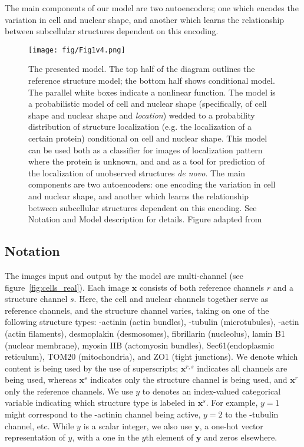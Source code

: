 \documentclass[accepted]{article}
\begin{document}
The main components of our model are two autoencoders; one which encodes the variation in cell and nuclear shape, and another which learns the relationship between subcellular structures dependent on this encoding.

\begin{figure}[htbp]
\centering
\texttt{[image: fig/Fig1v4.png]}
\caption{The presented model.
The top half of the diagram outlines the reference structure model; the bottom half shows conditional model.
The parallel white boxes indicate a nonlinear function.
The model is a probabilistic model of cell and nuclear shape (specifically, of cell shape and nuclear shape and \emph{location}) wedded to a probability distribution of structure localization (e.g. the localization of a certain protein) conditional on cell and nuclear shape. This model can be used both as a classifier for images of localization pattern where the protein is unknown, and and as a tool for prediction of the localization of unobserved structures \emph{de novo}.
The main components are two autoencoders: one encoding the variation in cell and nuclear shape, and another which learns the relationship between subcellular structures dependent on this encoding. See Notation and Model description for details.
Figure adapted from \cite{Makhzani:2015tm}}
\label{fig:model}
\end{figure}

\subsection*{Notation}
The images input and output by the model are multi-channel (see figure~\ref{fig:cells_real}).
Each image $\bm{x}$ consists of both reference channels $r$ and a structure channel $s$.
Here, the cell and nuclear channels together serve as reference channels, and the structure channel varies, taking on one of the following structure types: \textalpha-actinin (actin bundles), \textalpha-tubulin (microtubules), \textbeta-actin (actin filaments), desmoplakin (desmosomes), fibrillarin (nucleolus), lamin B1 (nuclear membrane), myosin IIB (actomyosin bundles), Sec61\textbeta (endoplasmic reticulum), TOM20 (mitochondria), and ZO1 (tight junctions).
We denote which content is being used by the use of superscripts; $\bm{x}^{r,s}$ indicates all channels are being used, whereas $\bm{x}^{s}$ indicates only the structure channel is being used, and $\bm{x}^{r}$ only the reference channels.
We use $y$ to denotes an index-valued categorical variable indicating which structure type is labeled in $\bm{x}^{s}$.
For example, $y=1$ might correspond to the \textalpha-actinin channel being active, $y=2$ to the \textalpha-tubulin channel, etc.
While $y$ is a scalar integer, we also use $\bm{y}$, a one-hot vector representation of $y$, with a one in the $y$th element of $\bm{y}$ and zeros elsewhere.
\end{document}
